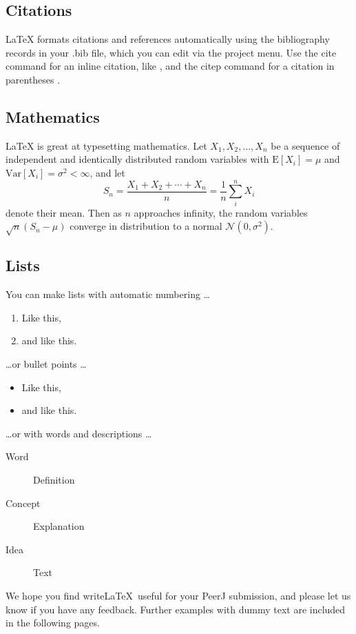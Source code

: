\documentclass[fleqn,10pt,lineno]{wlpeerj} %
\begin{document}
\subsection*{Citations}

LaTeX formats citations and references automatically using the bibliography records in your .bib file, which you can edit via the project menu. Use the cite command for an inline citation, like \cite{Figueredo:2009dg}, and the citep command for a citation in parentheses \citep{Figueredo:2009dg}.

\subsection*{Mathematics}

\LaTeX{} is great at typesetting mathematics. Let $X_1, X_2, \ldots, X_n$ be a sequence of independent and identically distributed random variables with $\text{E}[X_i] = \mu$ and $\text{Var}[X_i] = \sigma^2 < \infty$, and let
$$S_n = \frac{X_1 + X_2 + \cdots + X_n}{n}
      = \frac{1}{n}\sum_{i}^{n} X_i$$
denote their mean. Then as $n$ approaches infinity, the random variables $\sqrt{n}(S_n - \mu)$ converge in distribution to a normal $\mathcal{N}(0, \sigma^2)$.

\subsection*{Lists}

You can make lists with automatic numbering \dots

\begin{enumerate}[noitemsep]
\item Like this,
\item and like this.
\end{enumerate}
\dots or bullet points \dots
\begin{itemize}[noitemsep]
\item Like this,
\item and like this.
\end{itemize}
\dots or with words and descriptions \dots
\begin{description}
\item[Word] Definition
\item[Concept] Explanation
\item[Idea] Text
\end{description}

We hope you find write\LaTeX\ useful for your PeerJ submission, and please let us know if you have any feedback. Further examples with dummy text are included in the following pages.




\end{document}
